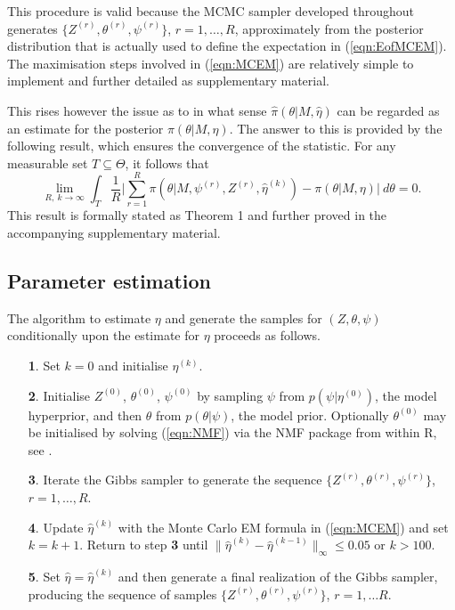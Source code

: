 \documentclass{bioinfo}
\begin{document}
This procedure is valid because the MCMC sampler developed throughout
generates $\{Z^{(r)}, \theta^{(r)}, \psi^{(r)}\}$, $r = 1,
\ldots, R$, approximately from the posterior distribution that is
actually used to define the expectation in (\ref{eqn:EofMCEM}). The maximisation steps involved in (\ref{eqn:MCEM}) are relatively
simple to implement and further detailed as supplementary material. 


This rises however the issue as to in what sense $\hat\pi(\theta|M,
\hat\eta)$ can be regarded as an estimate for the posterior 
$\pi(\theta|M, \eta)$. The answer to this is provided by the following
result, which ensures the convergence of the statistic. For any
measurable set $T\subseteq \Theta$, it follows that
\[
   \lim_{R,\ k\to\infty}
     \int_T \frac{1}{R}
    \bigg|
       \sum_{r=1}^R \pi(\theta|M, \psi^{(r)}, Z^{(r)}, 
          \hat\eta^{(k)}) - \pi(\theta|M,\eta)
    \bigg|\ d\theta = 0.
\]
This result is formally stated as Theorem 1 and further proved in the
accompanying supplementary material.





\subsection{Parameter estimation}
The algorithm to estimate $\eta$ and generate the samples for $(Z,
\theta, \psi)$ conditionally upon the estimate for $\eta$ proceeds as 
follows. 
\begin{enumerate}
\item[\textbf{1}.] Set $k = 0$ and initialise $\eta^{(k)}$.
\item[\textbf{2}.] Initialise $Z^{(0)}$, $\theta^{(0)}$, $\psi^{(0)}$
  by sampling $\psi$ from $p(\psi|\eta^{(0)})$, the model hyperprior,
  and then $\theta$ from $p(\theta|\psi)$, the model prior. Optionally
  $\theta^{(0)}$ may be initialised by solving (\ref{eqn:NMF})
  via the NMF package from within R, see \citealp{GS}. 
\item[\textbf{3}.] Iterate the Gibbs sampler to generate the sequence
$\{Z^{(r)}, \theta^{(r)}, \psi^{(r)}\}$, $r = 1, \ldots, R$.
\item[\textbf{4}.] Update $\hat\eta^{(k)}$ with the Monte Carlo EM
formula in (\ref{eqn:MCEM}) and set $k = k+1$. Return to step
\textbf{3} until $\big\|\hat\eta^{(k)} - \hat\eta^{(k-1)}\big\|_\infty 
\leqslant 0.05$ or $k > 100$. 
\item[\textbf{5}.] Set $\hat\eta = \hat\eta^{(k)}$ and then generate a 
  final realization of the Gibbs sampler, producing the sequence of
  samples $\{Z^{(r)}, \theta^{(r)}, \psi^{(r)}\}$, $r=1, \ldots
  R$. 
\end{enumerate}
\end{document}
